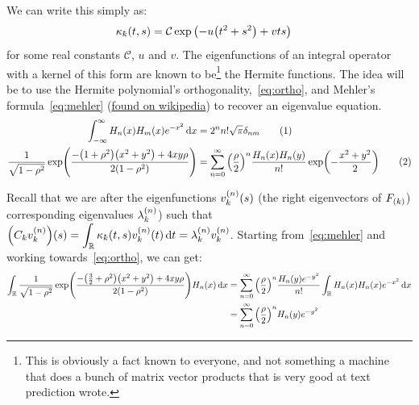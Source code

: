 \documentclass[12pt]{article}
\newcommand\todo[1]{
    \Huge{\color{red}{TODO:~#1}}\normalsize{}
}
\newcommand{\kbar}{\mathchar'26\mkern-9mu k}
\numberwithin{theorem}{section}
\numberwithin{equation}{section}
\numberwithin{figure}{section}
\begin{document}
We can write this simply as:
\begin{align*}
    \kappa_{\kbar}\qty(t, s) &= \mathcal{C} \exp\qty(-u\qty(t^2 + s^2) + vts)
\end{align*}
for some real constants \(\mathcal{C}\), \(u\) and \(v\). The eigenfunctions of
an integral operator with a kernel of this form are known to be\footnote{This is
obviously a fact known to everyone, and not something a machine that does a
bunch of matrix vector products that is very good at text prediction wrote.} the
Hermite functions. The idea will be to use the Hermite polynomial's
orthogonality,~\cref{eq:ortho}, and Mehler's formula~\cref{eq:mehler}
(\href{https://en.wikipedia.org/wiki/Mehler_kernel?oldformat=true#Physics_version}{found
on wikipedia}) to recover an eigenvalue equation.
\begin{align*}
    \int_{-\infty}^{\infty} H_n\qty(x)H_m\qty(x) e^{-x^2} \dd{x} &= 2^n n! \sqrt{\pi} \delta_{nm}\stepcounter{equation}\tag{\theequation}\label{eq:ortho} \\
    \frac{1}{\sqrt{1 - \rho^2}}\exp(\frac{-\qty(1 + \rho^2)\qty(x^2 + y^2) + 4xy\rho}{2\qty(1 - \rho^2)}) &= \sum_{n=0}^{\infty} \qty(\frac{\rho}{2})^n \frac{H_n\qty(x)H_n\qty(y)}{n!} \exp(-\frac{x^2 + y^2}{2})\stepcounter{equation}\tag{\theequation}\label{eq:mehler}
\end{align*}

\todo{just use hermite functions and you're good}

Recall that we are after the eigenfunctions \(v_k^{\qty(n)}\qty(s)\) (the right
eigenvectors of \(F_{\qty(k)}\)) corresponding eigenvalues
\(\lambda_k^{\qty(n)}\)) such that \(\displaystyle\qty(C_kv_k^{\qty(n)})\qty(s)
= \int_{\mathbb{R}} \kappa_{\kbar}\qty(t, s) v_k^{\qty(n)}\qty(t) \dd{t} =
\lambda_k^{\qty(n)}v_k^{\qty(n)}\). Starting from~\cref{eq:mehler} and working
towards~\cref{eq:ortho}, we can get:
\begin{align*}
    \int_{\mathbb{R}} \frac{1}{\sqrt{1 - \rho^2}} \exp(\frac{-\qty(\frac{3}{2} + \rho^2)\qty(x^2 + y^2) + 4xy\rho}{2\qty(1 - \rho^2)}) H_n\qty(x) \dd{x} &= \sum_{n=0}^{\infty} \qty(\frac{\rho}{2})^n \frac{H_n\qty(y)e^{-y^2}}{n!} \int_{\mathbb{R}}  H_n\qty(x)H_n\qty(x) e^{-x^2} \dd{x} \\
                                                                                                                                                         &= \sum_{n=0}^{\infty} \qty(\frac{\rho}{2})^n H_n\qty(y) e^{-y^2}
\end{align*}
\end{document}
